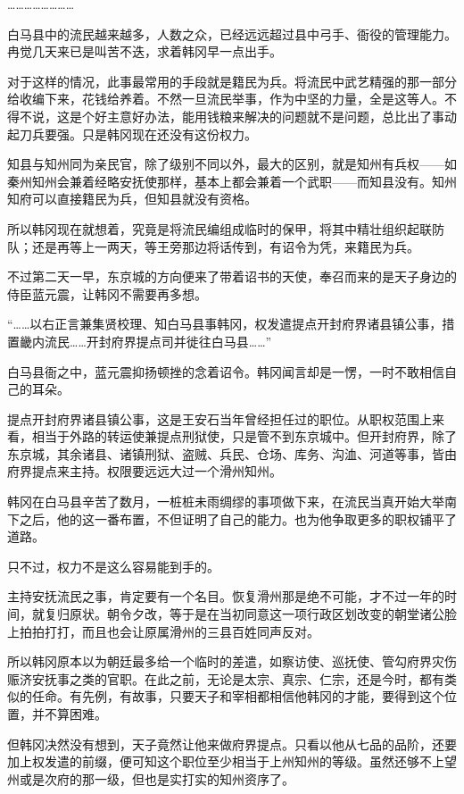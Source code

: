 ……………………

白马县中的流民越来越多，人数之众，已经远远超过县中弓手、衙役的管理能力。冉觉几天来已是叫苦不迭，求着韩冈早一点出手。

对于这样的情况，此事最常用的手段就是籍民为兵。将流民中武艺精强的那一部分给收编下来，花钱给养着。不然一旦流民举事，作为中坚的力量，全是这等人。不得不说，这是个好主意好办法，能用钱粮来解决的问题就不是问题，总比出了事动起刀兵要强。只是韩冈现在还没有这份权力。

知县与知州同为亲民官，除了级别不同以外，最大的区别，就是知州有兵权——如秦州知州会兼着经略安抚使那样，基本上都会兼着一个武职——而知县没有。知州知府可以直接籍民为兵，但知县就没有资格。

所以韩冈现在就想着，究竟是将流民编组成临时的保甲，将其中精壮组织起联防队；还是再等上一两天，等王旁那边将话传到，有诏令为凭，来籍民为兵。

不过第二天一早，东京城的方向便来了带着诏书的天使，奉召而来的是天子身边的侍臣蓝元震，让韩冈不需要再多想。

“……以右正言兼集贤校理、知白马县事韩冈，权发遣提点开封府界诸县镇公事，措置畿内流民……开封府界提点司并徙往白马县……”

白马县衙之中，蓝元震抑扬顿挫的念着诏令。韩冈闻言却是一愣，一时不敢相信自己的耳朵。

提点开封府界诸县镇公事，这是王安石当年曾经担任过的职位。从职权范围上来看，相当于外路的转运使兼提点刑狱使，只是管不到东京城中。但开封府界，除了东京城，其余诸县、诸镇刑狱、盗贼、兵民、仓场、库务、沟洫、河道等事，皆由府界提点来主持。权限要远远大过一个滑州知州。

韩冈在白马县辛苦了数月，一桩桩未雨绸缪的事项做下来，在流民当真开始大举南下之后，他的这一番布置，不但证明了自己的能力。也为他争取更多的职权铺平了道路。

只不过，权力不是这么容易能到手的。

主持安抚流民之事，肯定要有一个名目。恢复滑州那是绝不可能，才不过一年的时间，就复归原状。朝令夕改，等于是在当初同意这一项行政区划改变的朝堂诸公脸上拍拍打打，而且也会让原属滑州的三县百姓同声反对。

所以韩冈原本以为朝廷最多给一个临时的差遣，如察访使、巡抚使、管勾府界灾伤赈济安抚事之类的官职。在此之前，无论是太宗、真宗、仁宗，还是今时，都有类似的任命。有先例，有故事，只要天子和宰相都相信他韩冈的才能，要得到这个位置，并不算困难。

但韩冈决然没有想到，天子竟然让他来做府界提点。只看以他从七品的品阶，还要加上权发遣的前缀，便可知这个职位至少相当于上州知州的等级。虽然还够不上望州或是次府的那一级，但也是实打实的知州资序了。

